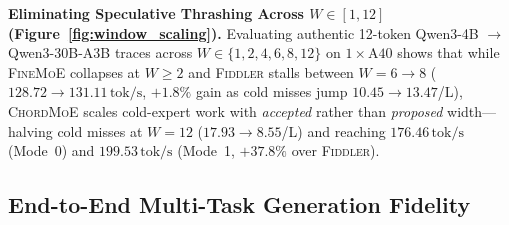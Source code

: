 \documentclass[10pt,twocolumn]{article}
\theoremstyle{definition}
\begin{document}
\vspace{2pt}
\noindent\textbf{Eliminating Speculative Thrashing Across $W \in [1, 12]$ (Figure~\ref{fig:window_scaling}).}
Evaluating authentic 12-token Qwen3-4B $\to$ Qwen3-30B-A3B traces across $W \in \{1, 2, 4, 6, 8, 12\}$ on $1\times\text{A40}$ shows that while \textsc{FineMoE} collapses at $W \ge 2$ and \textsc{Fiddler} stalls between $W=6 \to 8$ ($128.72 \to 131.11\,\text{tok/s}$, $+1.8\%$ gain as cold misses jump $10.45 \to 13.47$/L), \textsc{ChordMoE} scales cold-expert work with \emph{accepted} rather than \emph{proposed} width—halving cold misses at $W=12$ ($17.93 \to 8.55$/L) and reaching \textbf{$176.46\,\text{tok/s}$} (Mode~0) and \textbf{$199.53\,\text{tok/s}$} (Mode~1, $+37.8\%$ over \textsc{Fiddler}).

\subsection{End-to-End Multi-Task Generation Fidelity}
\label{sec:eval_fidelity}

\begin{table}[t]
  \centering
  \caption{End-to-end multi-task speculative generation fidelity on live NVIDIA A40 using Qwen3-4B (Q8\_0 draft) $\to$ Qwen3-30B-A3B (Q8\_0 target, $\gamma=6$, greedy decoding across $9,024\text{--}9,600$ verification layer-windows). HumanEval solutions are verified via live Python \texttt{exec()} unit-test assertions~\cite{chen2021humaneval}; GSM8K checks exact numerical answers~\cite{cobbe2021gsm8k}.}
  \label{tab:multitask_fidelity}
  \footnotesize
  \setlength{\tabcolsep}{5.2pt}
\end{table}
\end{document}
